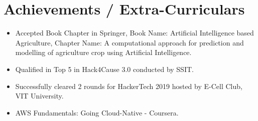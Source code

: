 \documentclass[letter,11pt]{article}
\newcommand{\resumeItem}[2]{
  \vspace{-2pt}\item\small{
    \textbf{#1}{#2 \vspace{-2pt}}
  }
}
\newcommand{\resumeSubItem}[2]{
  \vspace{-2pt}\resumeItem{#1}{#2} \vspace{-2pt}}
\newcommand{\resumeSubHeadingListStart}{\begin{itemize}[leftmargin=*]}
\newcommand{\resumeSubHeadingListEnd}{\end{itemize}}
\begin{document}
\section{\textbf{Achievements / Extra-Curriculars}}
\resumeSubHeadingListStart
\resumeSubItem{}{Accepted Book Chapter in Springer, Book Name: Artificial Intelligence based Agriculture, Chapter Name: A computational approach for prediction and modelling of agriculture crop using Artificial Intelligence.}
\vspace{3pt}
\resumeSubItem{}{Qualified in Top 5 in Hack4Cause 3.0 conducted by SSIT.}
\vspace{3pt}
\resumeSubItem{}{Successfully cleared 2 rounds for HackerTech 2019 hosted by E-Cell Club, VIT University.}
\vspace{3pt}
\resumeSubItem{}{AWS Fundamentals: Going Cloud-Native - Coursera.}
\resumeSubHeadingListEnd
\end{document}
